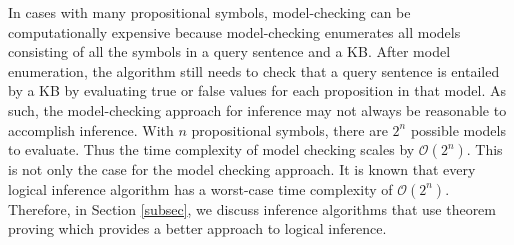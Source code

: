 \begin{enumerate}

\end{enumerate}

In cases with many propositional symbols, model-checking can be computationally expensive because model-checking enumerates all models consisting of all the symbols in a query sentence and a KB. After model enumeration, the algorithm still needs to check that a query sentence is entailed by a KB by evaluating true or false values for each proposition in that model. As such, the model-checking approach for inference may not always be reasonable to accomplish inference. With $n$ propositional symbols, there are $2^n$ possible models to evaluate. Thus the time complexity of model checking scales by $\mathcal{O}(2^n)$. This is not only the case for the model checking approach. It is known that every logical inference algorithm has a worst-case time complexity of $\mathcal{O}(2^n)$. Therefore, in Section \ref{subsec}, we discuss inference algorithms that use theorem proving which provides a better approach to logical inference.


